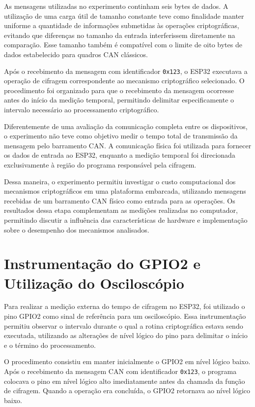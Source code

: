 As mensagens utilizadas no experimento continham seis bytes de dados. A utilização de uma carga útil de tamanho constante teve como finalidade manter uniforme a quantidade de informações submetidas às operações criptográficas, evitando que diferenças no tamanho da entrada interferissem diretamente na comparação. Esse tamanho também é compatível com o limite de oito bytes de dados estabelecido para quadros CAN clássicos.

Após o recebimento da mensagem com identificador \texttt{0x123}, o ESP32 executava a operação de cifragem correspondente ao mecanismo criptográfico selecionado. O procedimento foi organizado para que o recebimento da mensagem ocorresse antes do início da medição temporal, permitindo delimitar especificamente o intervalo necessário ao processamento criptográfico.

Diferentemente de uma avaliação da comunicação completa entre os dispositivos, o experimento não teve como objetivo medir o tempo total de transmissão da mensagem pelo barramento CAN. A comunicação física foi utilizada para fornecer os dados de entrada ao ESP32, enquanto a medição temporal foi direcionada exclusivamente à região do programa responsável pela cifragem.

Dessa maneira, o experimento permitiu investigar o custo computacional dos mecanismos criptográficos em uma plataforma embarcada, utilizando mensagens recebidas de um barramento CAN físico como entrada para as operações. Os resultados dessa etapa complementam as medições realizadas no computador, permitindo discutir a influência das características de hardware e implementação sobre o desempenho dos mecanismos analisados.

\section{Instrumentação do GPIO2 e Utilização do Osciloscópio}

Para realizar a medição externa do tempo de cifragem no ESP32, foi utilizado o pino GPIO2 como sinal de referência para um osciloscópio. Essa instrumentação permitiu observar o intervalo durante o qual a rotina criptográfica estava sendo executada, utilizando as alterações de nível lógico do pino para delimitar o início e o término do processamento.

O procedimento consistiu em manter inicialmente o GPIO2 em nível lógico baixo. Após o recebimento da mensagem CAN com identificador \texttt{0x123}, o programa colocava o pino em nível lógico alto imediatamente antes da chamada da função de cifragem. Quando a operação era concluída, o GPIO2 retornava ao nível lógico baixo.

